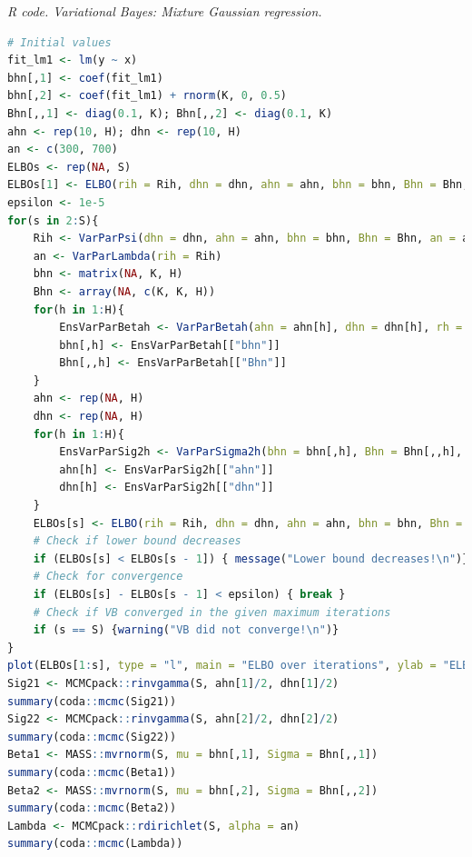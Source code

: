 \begin{enumerate}[leftmargin=*]
\begin{tcolorbox}[enhanced,width=4.67in,center upper,
	fontupper=\large\bfseries,drop shadow southwest,sharp corners]
	\textit{R code. Variational Bayes: Mixture Gaussian regression.}
	\begin{VF}
		\begin{lstlisting}[language=R]
# Initial values
fit_lm1 <- lm(y ~ x)
bhn[,1] <- coef(fit_lm1)
bhn[,2] <- coef(fit_lm1) + rnorm(K, 0, 0.5) 
Bhn[,,1] <- diag(0.1, K); Bhn[,,2] <- diag(0.1, K)
ahn <- rep(10, H); dhn <- rep(10, H)
an <- c(300, 700)
ELBOs <- rep(NA, S)
ELBOs[1] <- ELBO(rih = Rih, dhn = dhn, ahn = ahn, bhn = bhn, Bhn = Bhn, an = an)
epsilon <- 1e-5
for(s in 2:S){
	Rih <- VarParPsi(dhn = dhn, ahn = ahn, bhn = bhn, Bhn = Bhn, an = an)
	an <- VarParLambda(rih = Rih)
	bhn <- matrix(NA, K, H)
	Bhn <- array(NA, c(K, K, H))
	for(h in 1:H){
		EnsVarParBetah <- VarParBetah(ahn = ahn[h], dhn = dhn[h], rh = Rih[,h])
		bhn[,h] <- EnsVarParBetah[["bhn"]]
		Bhn[,,h] <- EnsVarParBetah[["Bhn"]] 
	}
	ahn <- rep(NA, H)
	dhn <- rep(NA, H)
	for(h in 1:H){
		EnsVarParSig2h <- VarParSigma2h(bhn = bhn[,h], Bhn = Bhn[,,h], rh = Rih[,h])
		ahn[h] <- EnsVarParSig2h[["ahn"]]
		dhn[h] <- EnsVarParSig2h[["dhn"]] 
	}
	ELBOs[s] <- ELBO(rih = Rih, dhn = dhn, ahn = ahn, bhn = bhn, Bhn = Bhn, an = an)
	# Check if lower bound decreases
	if (ELBOs[s] < ELBOs[s - 1]) { message("Lower bound decreases!\n")}
	# Check for convergence
	if (ELBOs[s] - ELBOs[s - 1] < epsilon) { break }
	# Check if VB converged in the given maximum iterations
	if (s == S) {warning("VB did not converge!\n")}
}
plot(ELBOs[1:s], type = "l", main = "ELBO over iterations", ylab = "ELBO", xlab = "Iteration")
Sig21 <- MCMCpack::rinvgamma(S, ahn[1]/2, dhn[1]/2) 
summary(coda::mcmc(Sig21))
Sig22 <- MCMCpack::rinvgamma(S, ahn[2]/2, dhn[2]/2) 
summary(coda::mcmc(Sig22))
Beta1 <- MASS::mvrnorm(S, mu = bhn[,1], Sigma = Bhn[,,1])
summary(coda::mcmc(Beta1))
Beta2 <- MASS::mvrnorm(S, mu = bhn[,2], Sigma = Bhn[,,2])
summary(coda::mcmc(Beta2))
Lambda <- MCMCpack::rdirichlet(S, alpha = an)
summary(coda::mcmc(Lambda))
\end{lstlisting}
	\end{VF}
\end{tcolorbox}

\end{enumerate}
